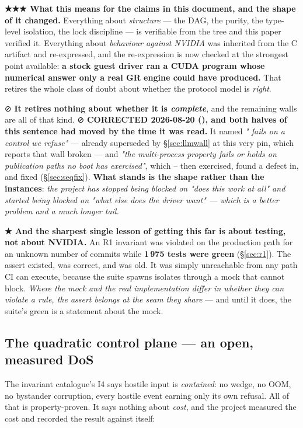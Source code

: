 \documentclass[10.5pt]{article}
\begin{document}
\textbf{★★★ What this means for the claims in this document, and the shape of it changed.}
Everything about \emph{structure} — the DAG, the purity, the type-level isolation, the lock
discipline — is verifiable from the tree and this paper verified it. Everything about
\emph{behaviour against NVIDIA} was inherited from the C artifact and re-expressed, and the
re-expression is now checked at the strongest point available: \textbf{a stock guest driver ran a
CUDA program whose numerical answer only a real GR engine could have produced.} That retires the
whole class of doubt about whether the protocol model is \emph{right}.

\smallskip
⊘ \textbf{It retires nothing about whether it is \emph{complete}}, and the remaining walls are all
of that kind. ⊘ \textbf{CORRECTED 2026-08-20 (), and both halves of this sentence
had moved by the time it was read.} It named \emph{" fails on a control we refuse"}
--- already superseded by \S\ref{sec:llmwall} at this very pin, which reports that wall broken
--- and \emph{"the multi-process property fails or holds on publication paths no boot has
exercised"}, which -- then exercised, found a defect in, and fixed
(\S\ref{sec:seqfix}). \textbf{What stands is the shape rather than the instances}: \emph{the
project has stopped being blocked on "does this work at all" and started being blocked on "what
else does the driver want" — which is a better problem and a much longer tail.}

\begin{claimbox}\small
\textbf{★ And the sharpest single lesson of getting this far is about testing, not about NVIDIA.}
An R1 invariant was violated on the production path for an unknown number of commits while
\textbf{1\,975 tests were green} (\S\ref{sec:r1}). The assert existed, was correct, and was old.
It was simply unreachable from any path CI can execute, because the suite spawns isolates through
a mock that cannot block. \emph{Where the mock and the real implementation differ in whether they
can violate a rule, the assert belongs at the seam they share} — and until it does, the suite's
green is a statement about the mock.
\end{claimbox}

\subsection{The quadratic control plane --- an open, measured DoS}

The invariant catalogue's I4 says hostile input is \emph{contained}: no wedge, no OOM, no
bystander corruption, every hostile event earning only its own refusal. All of that is
property-proven. It says nothing about \emph{cost}, and the project measured the cost and
recorded the result against itself:
\end{document}
